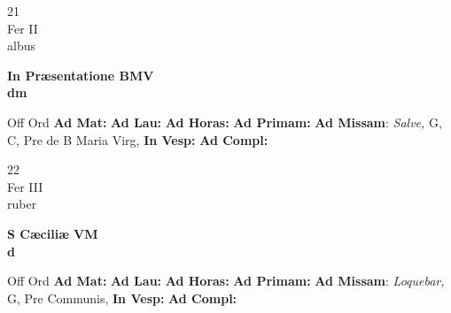 \documentclass[10pt, openany]{book}
\begin{document}
    \begin{center}
        \begin{minipage}{3.5in}
            \vspace{2em}
            \begin{minipage}{0.5in}
                {\Huge 21} \\
                {\normalsize Fer II} \\
                {\normalsize albus}
            \end{minipage}
            \begin{minipage}{3.0in}
                \textbf{ \large In Præsentatione BMV \\
                \textnormal{\normalsize dm}} \\ 
            \end{minipage}
            \begin{justify}Off Ord
                \textbf{Ad Mat: }
                \textbf{Ad Lau: }
                \textbf{Ad Horas: }
                \textbf{Ad Primam: }\textbf{Ad Missam}: \textit{Salve,} G, C, Pre de B Maria Virg,  
                \textbf{In Vesp: }
                \textbf{Ad Compl: }
            \end{justify}
        \end{minipage}
    \end{center}

    \begin{center}
        \begin{minipage}{3.5in}
            \vspace{2em}
            \begin{minipage}{0.5in}
                {\Huge 22} \\
                {\normalsize Fer III} \\
                {\normalsize ruber}
            \end{minipage}
            \begin{minipage}{3.0in}
                \textbf{ \large S Cæciliæ VM \\
                \textnormal{\normalsize d}} \\ 
            \end{minipage}
            \begin{justify}Off Ord
                \textbf{Ad Mat: }
                \textbf{Ad Lau: }
                \textbf{Ad Horas: }
                \textbf{Ad Primam: }\textbf{Ad Missam}: \textit{Loquebar,} G, Pre Communis,  
                \textbf{In Vesp: }
                \textbf{Ad Compl: }
            \end{justify}
        \end{minipage}
    \end{center}
\end{document}
